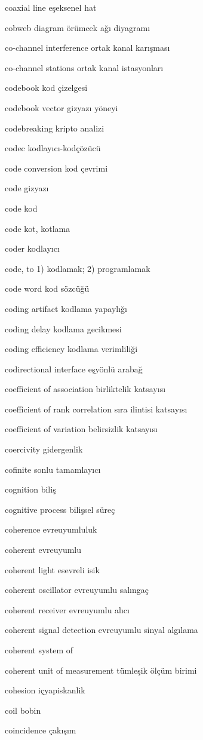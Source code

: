 \documentclass[12pt,fleqn]{article}\usepackage{../../common}
\begin{document}
coaxial line eşeksenel hat

cobweb diagram örümcek ağı diyagramı

co-channel interference ortak kanal karışması

co-channel stations ortak kanal istasyonları

codebook kod çizelgesi

codebook vector gizyazı yöneyi

codebreaking kripto analizi

codec kodlayıcı-kodçözücü

code conversion kod çevrimi

code gizyazı

code kod

code kot, kotlama

coder kodlayıcı

code, to 1) kodlamak; 2) programlamak

code word kod sözcüğü

coding artifact kodlama yapaylığı

coding delay kodlama gecikmesi

coding efficiency kodlama verimliliği

codirectional interface eşyönlü arabağ

coefficient of association birliktelik katsayısı

coefficient of rank correlation sıra ilintisi katsayısı

coefficient of variation belirsizlik katsayısı

coercivity gidergenlik

cofinite sonlu tamamlayıcı

cognition biliş

cognitive process bilişsel süreç

coherence evreuyumluluk

coherent evreuyumlu

coherent light esevreli isik

coherent oscillator evreuyumlu salıngaç

coherent receiver evreuyumlu alıcı

coherent signal detection evreuyumlu sinyal algılama

coherent system of

coherent unit of measurement tümleşik ölçüm birimi

cohesion içyapiskanlik

coil bobin

coincidence çakışım
\end{document}
